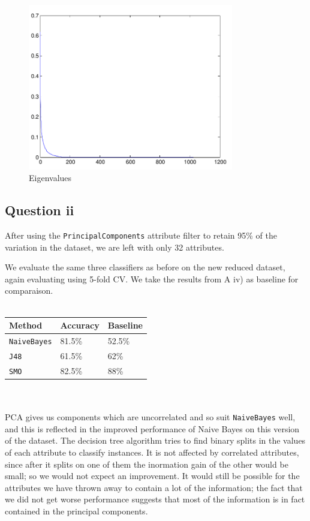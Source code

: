 \documentclass[a4paper]{article}
\begin{document}
\begin{figure}[!htbp]
\centering
\includegraphics[width=0.8\textwidth]{C1-img1-eigenvalues-cropped.pdf}
\caption{Eigenvalues}
\label{fig:c1img1}
\end{figure}

\FloatBarrier

\subsection*{Question ii}

After using the {\tt PrincipalComponents} attribute filter to retain 95\% of the variation in the dataset, we are left with only 32 attributes.

We evaluate the same three classifiers as before on the new reduced dataset, again evaluating using 5-fold CV. We take the results from A iv) as baseline for comparaison.\\
\\
\begin{tabular}{lll}
Method & Accuracy & Baseline \\
\hline
{\tt NaiveBayes} & 81.5\% & 52.5\% \\
{\tt J48} & 61.5\% & 62\% \\
{\tt SMO} & 82.5\% & 88\%
\end{tabular}\\
\\
PCA gives us components which are uncorrelated and so suit {\tt NaiveBayes} well, and this is reflected in the improved performance of Naive Bayes on this version of the dataset.
The decision tree algorithm tries to find binary splits in the values of each attribute to classify instances. It is not affected by correlated attributes, since after it splits on one of them the inormation gain of the other would be small; so we would not expect an improvement. It would still be possible for the attributes we have thrown away to contain a lot of the information; the fact that we did not get worse performance suggests that most of the information is in fact contained in the principal components. 
\end{document}
